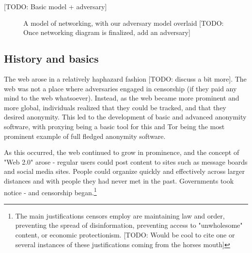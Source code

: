 \documentclass[12pt]{report}
\begin{document}
[TODO: Basic model + adversary]

\begin{figure}
\begin{center}
{}
\end{center}
\caption{A model of networking, with our adversary model overlaid [TODO: Once networking diagram is finalized, add an adversary]}
\end{figure}

\subsection{History and basics}

The web arose in a relatively haphazard fashion [TODO: discuss a bit more]. The web was not a place where adversaries engaged in censorship (if they paid any mind to the web whatsoever). Instead, as the web became more prominent and more global, individuals realized that they could be tracked, and that they desired anonymity. This led to the development of basic and advanced anonymity software, with proxying being a basic tool for this and Tor being the most prominent example of full fledged anonymity software.

As this occurred, the web continued to grow in prominence, and the concept of "Web 2.0" arose - regular users could post content to sites such as message boards and social media sites. People could organize quickly and effectively across larger distances and with people they had never met in the past. Governments took notice - and censorship began.\footnote{The main justifications censors employ are maintaining law and order, preventing the spread of disinformation, preventing access to "unwholesome" content, or economic protectionism. [TODO: Would be cool to cite one or several instances of these justifications coming from the horses mouth]}
\end{document}
